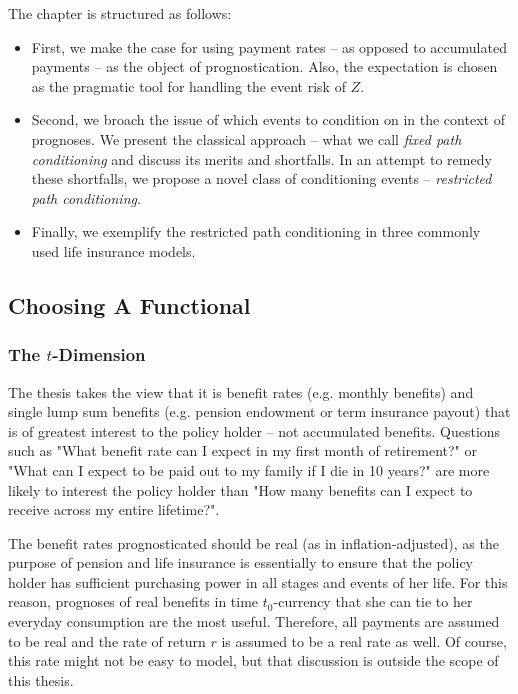 \documentclass{article}
\newcommand{\1}[1]{\mathbbm{1}_{\left\lbrace #1 \right\rbrace}}
\theoremstyle{break}
\theoremstyle{remark}
\numberwithin{equation}{section}
\begin{document}
The chapter is structured as follows:

\begin{itemize}
	\item First, we make the case for using payment rates -- as opposed to accumulated payments -- as the object of prognostication. Also, the expectation is chosen as the pragmatic tool for handling the event risk of $Z$.
	\item Second, we broach the issue of which events to condition on in the context of prognoses. We present the classical approach -- what we call \textit{fixed path conditioning} and discuss its merits and shortfalls. In an attempt to remedy these shortfalls, we propose a novel class of conditioning events -- \textit{restricted path conditioning}.
	\item Finally, we exemplify the restricted path conditioning in three commonly used life insurance models.
\end{itemize}

\subsection{Choosing A Functional}

\subsubsection{The $t$-Dimension}

The thesis takes the view that it is benefit rates (e.g. monthly benefits) and single lump sum benefits (e.g. pension endowment or term insurance payout) that is of greatest interest to the policy holder -- not accumulated benefits. Questions such as "What benefit rate can I expect in my first month of retirement?" or "What can I expect to be paid out to my family if I die in 10 years?" are more likely to interest the policy holder than "How many benefits can I expect to receive across my entire lifetime?".

The benefit rates prognosticated should be real (as in inflation-adjusted), as the purpose of pension and life insurance is essentially to ensure that the policy holder has sufficient purchasing power in all stages and events of her life. For this reason, prognoses of real benefits in time $t_0$-currency that she can tie to her everyday consumption are the most useful. Therefore, all payments are assumed to be real and the rate of return $r$ is assumed to be a real rate as well. Of course, this rate might not be easy to model, but that discussion is outside the scope of this thesis.
\end{document}
